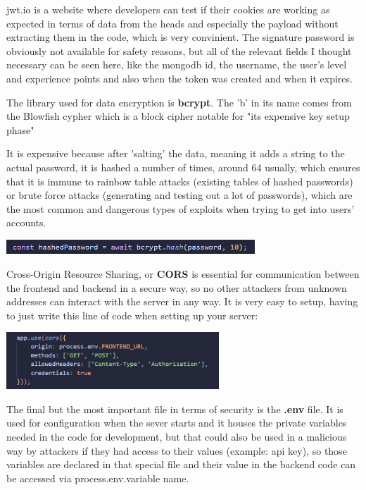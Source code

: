 \documentclass[12pt,a4paper]{report}
\begin{document}
jwt.io is a website where developers can test if their cookies are working as expected in terms of data from the heads and especially the payload without extracting them in the code, which is very convinient. The signature password is obviously not available for safety reasons, but all of the relevant fields I thought necessary can be seen here, like the mongodb id, the username, the user's level and experience points and also when the token was created and when it expires.

The library used for data encryption is \textbf{bcrypt}. The 'b' in its name comes from the Blowfish cypher which is a block cipher notable for "its expensive key setup phase"~\cite{blowfishCipher}

It is expensive because after 'salting' the data, meaning it adds a string to the actual password, it is hashed a number of times, around 64 usually, which ensures that it is immune to rainbow table attacks (existing tables of hashed passwords) or brute force attacks (generating and testing out a lot of passwords), which are the most common and dangerous types of exploits when trying to get into users' accounts.

\begin{center}
\includegraphics[width=0.7\textwidth]{images/bcrypt.png}
\end{center}

Cross-Origin Resource Sharing, or \textbf{CORS} is essential for communication between the frontend and backend in a secure way, so no other attackers from unknown addresses can interact with the server in any way. It is very easy to setup, having to just write this line of code when setting up your server: 

\begin{center}
\includegraphics[width=0.6\textwidth]{images/cors.png}
\end{center}

The final but the most important file in terms of security is the \textbf{.env} file. It is used for configuration when the sever starts and it houses the private variables needed in the code for development, but that could also be used in a malicious way by attackers if they had access to their values (example: api key), so those variables are declared in that special file and their value in the backend code can be accessed via process.env.variable name.
\end{document}
